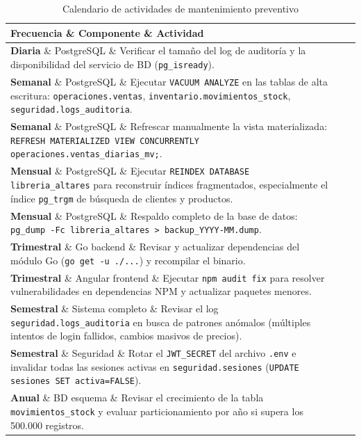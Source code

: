 \documentclass[12pt,a4paper,oneside]{report}
\begin{document}
\begin{table}[H]
\centering
\caption{Calendario de actividades de mantenimiento preventivo}
\begin{tabularx}{\textwidth}{|l|l|X|}
\hline
\rowcolor{lightgray}
\textbf{Frecuencia} \& \textbf{Componente} \& \textbf{Actividad} \\
\hline
\textbf{Diaria} \& PostgreSQL \& Verificar el tamaño del log de auditoría y la disponibilidad del servicio de BD (\texttt{pg\_isready}). \\
\hline
\textbf{Semanal} \& PostgreSQL \& Ejecutar \texttt{VACUUM ANALYZE} en las tablas de alta escritura: \texttt{operaciones.ventas}, \texttt{inventario.movimientos\_stock}, \texttt{seguridad.logs\_auditoria}. \\
\hline
\textbf{Semanal} \& PostgreSQL \& Refrescar manualmente la vista materializada: \texttt{REFRESH MATERIALIZED VIEW CONCURRENTLY operaciones.ventas\_diarias\_mv;}. \\
\hline
\textbf{Mensual} \& PostgreSQL \& Ejecutar \texttt{REINDEX DATABASE libreria\_altares} para reconstruir índices fragmentados, especialmente el índice \texttt{pg\_trgm} de búsqueda de clientes y productos. \\
\hline
\textbf{Mensual} \& PostgreSQL \& Respaldo completo de la base de datos: \texttt{pg\_dump -Fc libreria\_altares > backup\_YYYY-MM.dump}. \\
\hline
\textbf{Trimestral} \& Go backend \& Revisar y actualizar dependencias del módulo Go (\texttt{go get -u ./...}) y recompilar el binario. \\
\hline
\textbf{Trimestral} \& Angular frontend \& Ejecutar \texttt{npm audit fix} para resolver vulnerabilidades en dependencias NPM y actualizar paquetes menores. \\
\hline
\textbf{Semestral} \& Sistema completo \& Revisar el log \texttt{seguridad.logs\_auditoria} en busca de patrones anómalos (múltiples intentos de login fallidos, cambios masivos de precios). \\
\hline
\textbf{Semestral} \& Seguridad \& Rotar el \texttt{JWT\_SECRET} del archivo \texttt{.env} e invalidar todas las sesiones activas en \texttt{seguridad.sesiones} (\texttt{UPDATE sesiones SET activa=FALSE}). \\
\hline
\textbf{Anual} \& BD esquema \& Revisar el crecimiento de la tabla \texttt{movimientos\_stock} y evaluar particionamiento por año si supera los 500.000 registros. \\
\hline
\end{tabularx}
\label{tab:mantenimiento-preventivo}
\end{table}
\end{document}
